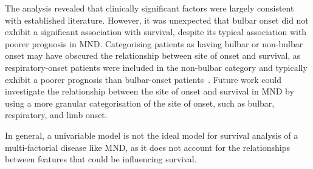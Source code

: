 The analysis revealed that clinically significant factors were largely consistent with established literature.
However, it was unexpected that bulbar onset did not exhibit a significant association with survival, despite its typical association with poorer prognosis in MND.
Categorising patients as having bulbar or non-bulbar onset may have obscured the relationship between site of onset and survival, as respiratory-onset patients were included in the non-bulbar category and typically exhibit a poorer prognosis than bulbar-onset patients~\cite{suPredictorsSurvivalPatients2021}.
Future work could investigate the relationship between the site of onset and survival in MND by using a more granular categorisation of the site of onset, such as bulbar, respiratory, and limb onset.

In general, a univariable model is not the ideal model for survival analysis of a multi-factorial disease like MND, as it does not account for the relationships between features that could be influencing survival.

